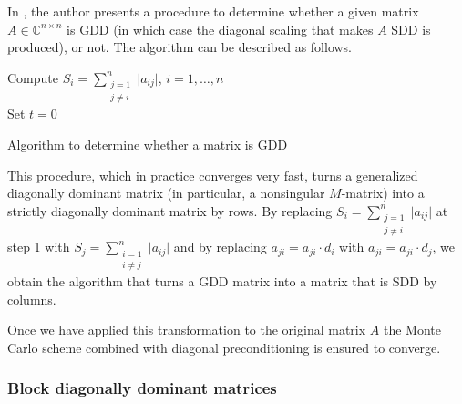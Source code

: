 \documentclass[times]{nlaauth}
\begin{document}
In \cite{Li2002}, the author presents a procedure to determine
whether a given matrix $A\in\mathbb{C}^{n\times n}$
is GDD (in which case the diagonal scaling that
makes $A$ SDD is produced), or not.
The algorithm can be described as follows.

\begin{algorithm}[H]
\LinesNumbered

 Compute $\displaystyle S_{i}=\sum_{\substack{j=1 \\ j\ne i}}^n\lvert
a_{ij}\rvert$,
$i=1,\ldots,n$\\
Set $t=0$\\
 \caption{Algorithm to determine whether a matrix is GDD}
\end{algorithm}

This procedure, which in practice converges very fast, turns a generalized
diagonally dominant matrix (in particular, a nonsingular $M$-matrix) into a
strictly diagonally dominant matrix by rows. By replacing
$\displaystyle S_{i}=\sum^{n}_{\substack{j=1 \\ j\ne i}}\lvert a_{ij}\rvert$
at step 1 with
$\displaystyle S_{j}=\sum^{n}_{\substack{i=1 \\ i\ne j}}\lvert a_{ij}\rvert$
and by replacing
$a_{ji}=a_{ji}\cdot d_i$ with $a_{ji}=a_{ji}\cdot d_j$, we obtain the algorithm
that turns a GDD matrix into a matrix that is SDD by columns.

Once we have applied this transformation to the original matrix $A$
the Monte Carlo scheme combined with diagonal preconditioning
is ensured to converge.

\subsubsection{Block diagonally dominant matrices}
\label{sec:bdd}
\end{document}
